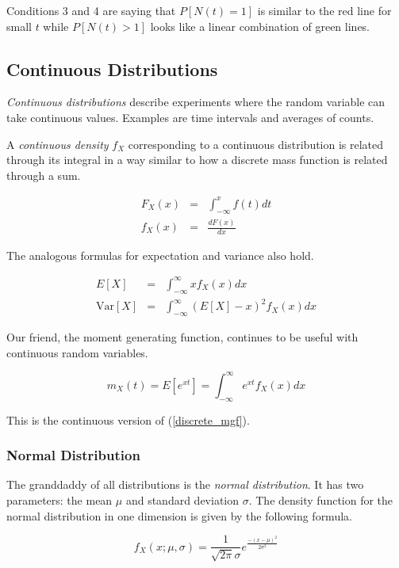 \documentclass[]{article}
\begin{document}
Conditions 3 and 4 are saying that $P[N(t) = 1]$ is similar
to the red line for small $t$ while $P[N(t) > 1]$
looks like a linear combination of green lines.

\subsection{Continuous Distributions}

\emph{Continuous distributions} describe experiments where
the random variable can take continuous values.  Examples
are time intervals and averages of counts.

A \emph{continuous density} $f_X$ corresponding to a continuous
distribution is related through its integral in a way similar to
how a discrete mass function is related through a sum.

\begin{eqnarray*}
F_X(x) & = & \int_{-\infty}^x f(t) dt \\
f_X(x) & = & \frac{dF(x)}{dx}
\end{eqnarray*}

The analogous formulas for expectation and variance also hold.

\begin{eqnarray}
E[X] & = & \int_{-\infty}^{\infty} xf_X(x) dx \label{cont_mean} \\
\mbox{Var}[X] & = & \int_{-\infty}^{\infty} (E[X] - x)^2 f_X(x) dx \label{cont_var}
\end{eqnarray}

Our friend, the moment generating function, continues to be useful
with continuous random variables.

\begin{equation} \label{cont_mgf}
m_X(t) = E[e^{xt}] = \int_{-\infty}^{\infty} e^{xt} f_X(x) dx
\end{equation}

This is the continuous version of (\ref{discrete_mgf}).

\subsubsection{Normal Distribution}

The granddaddy of all distributions is the \emph{normal distribution}.
It has two parameters: the mean $\mu$ and standard deviation
$\sigma$.  The density function for the normal distribution in one
dimension is given by the following formula.

\begin{equation}
f_X(x; \mu, \sigma) = \frac{1}{\sqrt{2\pi}\sigma}e^{\frac{-(x - \mu)^2}{2\sigma^2}}
\end{equation}
\end{document}
